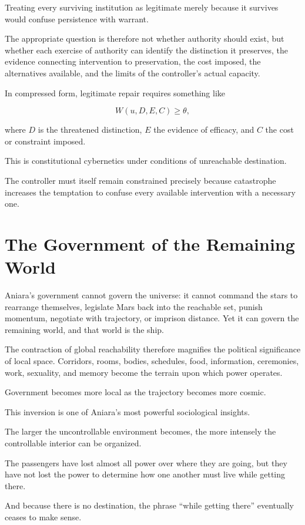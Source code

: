 \documentclass[11pt,oneside]{book}
\theoremstyle{definition}
\theoremstyle{remark}
\begin{document}
Treating every surviving institution as legitimate merely because it survives would confuse persistence with warrant.

The appropriate question is therefore not whether authority should exist, but whether each exercise of authority can identify the distinction it preserves, the evidence connecting intervention to preservation, the cost imposed, the alternatives available, and the limits of the controller's actual capacity.

In compressed form, legitimate repair requires something like

\[
W(u,D,E,C)\geq\theta,
\]

where \(D\) is the threatened distinction, \(E\) the evidence of efficacy, and \(C\) the cost or constraint imposed.

This is constitutional cybernetics under conditions of unreachable destination.

The controller must itself remain constrained precisely because catastrophe increases the temptation to confuse every available intervention with a necessary one.

\section{The Government of the Remaining World}

Aniara's government cannot govern the universe: it cannot command the stars to rearrange themselves, legislate Mars back into the reachable set, punish momentum, negotiate with trajectory, or imprison distance. Yet it can govern the remaining world, and that world is the ship.

The contraction of global reachability therefore magnifies the political significance of local space. Corridors, rooms, bodies, schedules, food, information, ceremonies, work, sexuality, and memory become the terrain upon which power operates.

Government becomes more local as the trajectory becomes more cosmic.

This inversion is one of Aniara's most powerful sociological insights.

The larger the uncontrollable environment becomes, the more intensely the controllable interior can be organized.

The passengers have lost almost all power over where they are going, but they have not lost the power to determine how one another must live while getting there.

And because there is no destination, the phrase ``while getting there'' eventually ceases to make sense.
\end{document}
